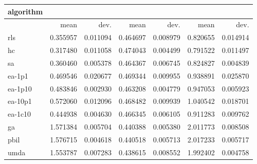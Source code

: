 \begin{tabular}{@{}l*{6}{>{{}}N{1}{2}}@{}}
\toprule
{algorithm} &  &  &  \\
\midrule
& {mean} & {dev.} & {mean} & {dev.} & {mean} & {dev.} \\
\midrule
rls & 0.355957 & 0.011094 & 0.464697 & 0.008979 & 0.820655 & 0.014914 \\
 hc & 0.317480 & 0.011058 & 0.474043 & 0.004499 & 0.791522 & 0.011497 \\
 sa & 0.360460 & 0.005378 & 0.464367 & 0.006745 & 0.824827 & 0.004839 \\
 ea-1p1 & 0.469546 & 0.020677 & 0.469344 & 0.009955 & 0.938891 & 0.025870 \\
 ea-1p10 & 0.483846 & 0.002930 & 0.463208 & 0.004779 & 0.947053 & 0.005923 \\
 ea-10p1 & 0.572060 & 0.012096 & 0.468482 & 0.009939 & 1.040542 & 0.018701 \\
 ea-1c10 & 0.444938 & 0.004630 & 0.466345 & 0.006105 & 0.911283 & 0.009762 \\
 ga & 1.571384 & 0.005704 & 0.440388 & 0.005380 & 2.011773 & 0.008508 \\
 pbil & 1.576715 & 0.004618 & 0.440518 & 0.005713 & 2.017233 & 0.005717 \\
 umda & 1.553787 & 0.007283 & 0.438615 & 0.008552 & 1.992402 & 0.004758 \\
 \bottomrule
\end{tabular}
